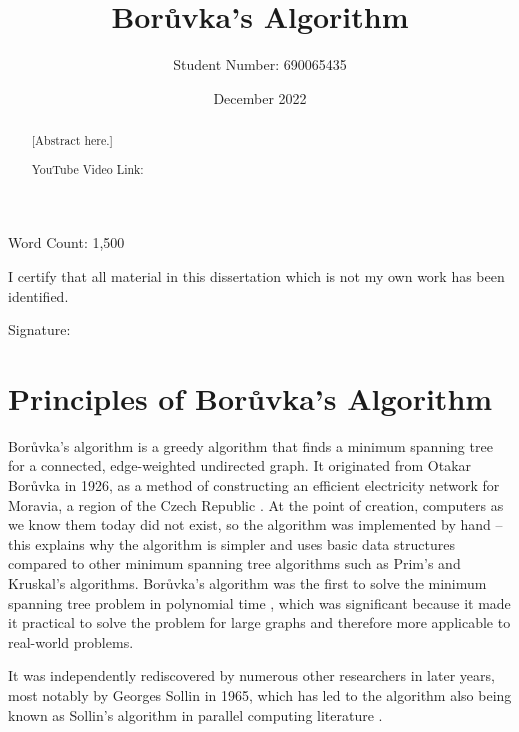 \documentclass[a4paper, 11pt]{article}
\begin{document}
\title{Borůvka's Algorithm}
\author{Student Number: 690065435}
\date{December 2022}

\maketitle

\begin{abstract}
[Abstract here.]

\begin{center}
    YouTube Video Link:
\end{center}
\end{abstract}

\vspace*{\fill}
\begin{center}
Word Count: 1,500

\vspace{1em}
I certify that all material in this dissertation which is not my own work has been identified.
\end{center}
\vspace{1em}

Signature: \hrulefill

\newpage
\section{Principles of Borůvka's Algorithm}
Borůvka's algorithm is a greedy algorithm that finds a minimum spanning tree for a connected, edge-weighted undirected graph. It originated from Otakar Borůvka in 1926, as a method of constructing an efficient electricity network for Moravia, a region of the Czech Republic \cite{nevsetvril2001otakar}. At the point of creation, computers as we know them today did not exist, so the algorithm was implemented by hand -- this explains why the algorithm is simpler and uses basic data structures compared to other minimum spanning tree algorithms such as Prim's and Kruskal's algorithms. Borůvka's algorithm was the first to solve the minimum spanning tree problem in polynomial time \cite{deterministicMSTs}, which was significant because it made it practical to solve the problem for large graphs and therefore more applicable to real-world problems.

It was independently rediscovered by numerous other researchers in later years, most notably by Georges Sollin in 1965, which has led to the algorithm also being known as Sollin's algorithm in parallel computing literature \cite{sollin1965trace}. 
\end{document}
